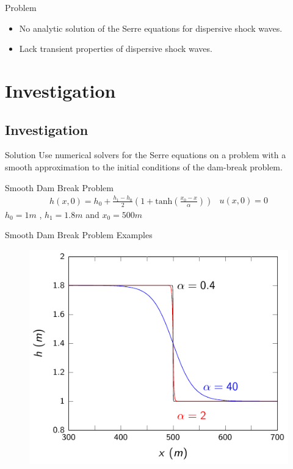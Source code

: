 \documentclass[pdf]{beamer}
\begin{document}
\begin{frame}{Problem}
	\begin{itemize}
		\item No analytic solution of the Serre equations for dispersive shock waves.
		\item Lack transient properties of dispersive shock waves.
	\end{itemize}
\end{frame}

\section{Investigation}
\subsection{Investigation}
\begin{frame}{Solution}
 	Use numerical solvers for the Serre equations on a problem with a smooth approximation to the initial conditions of the dam-break problem.
\end{frame}

\begin{frame}{Smooth Dam Break Problem}
	\begin{subequations}
		\begin{gather*}
		h(x,0) = h_0  + \frac{h_1 - h_0}{2} \left(1 + \text{tanh}\left(\frac{x_0 - x}{\alpha}\right)\right) 
		\end{gather*}
		\begin{gather*}
		u(x,0) = 0
		\end{gather*}
	\end{subequations} 
	\newline
	\centering
	$h_0 = 1m$ , $h_1 = 1.8m$ and $x_0 = 500m$
	
	
	
\end{frame}

\begin{frame}{Smooth Dam Break Problem Examples}
	\begin{figure}
		\includegraphics[width=0.7\linewidth]{./Pictures/DSW/DBSinit.pdf}
	\end{figure}	
	
\end{frame}
\end{document}
